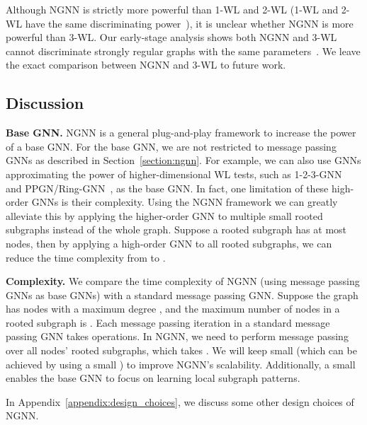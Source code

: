 \documentclass{article}
\begin{document}
Although NGNN is strictly more powerful than 1-WL and 2-WL (1-WL and 2-WL have the same discriminating power~\citep{maron2019provably}), it is unclear whether NGNN is more powerful than 3-WL. Our early-stage analysis shows both NGNN and 3-WL cannot discriminate strongly regular graphs with the same parameters~\cite{brouwer2012strongly}. We leave the exact comparison between NGNN and 3-WL to future work.



\subsection{Discussion}\label{sec:discussion}



\textbf{Base GNN.} NGNN is a general plug-and-play framework to increase the power of a base GNN. For the base GNN, we are not restricted to message passing GNNs as described in Section~\ref{section:ngnn}.
For example, we can also use GNNs approximating the power of higher-dimensional WL tests, such as 1-2-3-GNN~\cite{morris2019weisfeiler} and PPGN/Ring-GNN~\citep{maron2019provably,chen2019equivalence}, as the base GNN. In fact, one limitation of these high-order GNNs is their  complexity. Using the NGNN framework we can greatly alleviate this by applying the higher-order GNN to multiple small rooted subgraphs instead of the whole graph.
Suppose a rooted subgraph has at most  nodes, then by applying a high-order GNN to all  rooted subgraphs, we can reduce the time complexity from  to . 

\textbf{Complexity.} We compare the time complexity of NGNN (using message passing GNNs as base GNNs) with a standard message passing GNN. Suppose the graph has  nodes with a maximum degree , and the maximum number of nodes in a rooted subgraph is . Each message passing iteration in a standard message passing GNN takes  operations. In NGNN, we need to perform message passing over all  nodes' rooted subgraphs, which takes . We will keep  small (which can be achieved by using a small ) to improve NGNN's scalability. Additionally, a small  enables the base GNN to focus on learning local subgraph patterns. 



In Appendix~\ref{appendix:design_choices}, we discuss some other design choices of NGNN.
\end{document}
